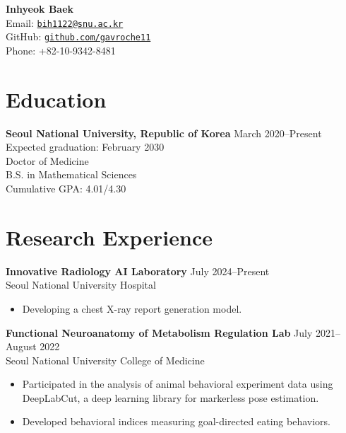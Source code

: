 \documentclass[11pt, a4paper]{article}
\begin{document}
\begin{center}
    \textbf{\Large Inhyeok Baek}\\
    \vspace{0.5mm}
    Email: \href{mailto:bih1122@snu.ac.kr}{\texttt{bih1122@snu.ac.kr}} \\
    GitHub: \href{https://github.com/gavroche11}{\texttt{github.com/gavroche11}} \\
    Phone: +82-10-9342-8481
\end{center}

\section*{Education}
\textbf{Seoul National University, Republic of Korea} \hfill March 2020--Present \\
\null\hfill {Expected graduation: February 2030}\smallskip \\
Doctor of Medicine\\
B.S. in Mathematical Sciences\\
Cumulative GPA: 4.01/4.30

\section*{Research Experience}
\textbf{Innovative Radiology AI Laboratory} \hfill July 2024--Present\\
Seoul National University Hospital \smallskip
\begin{itemize}[leftmargin=*, noitemsep, topsep=0pt, label=$\cdot$]
    \item Developing a chest X-ray report generation model.
\end{itemize}
\bigskip
\textbf{Functional Neuroanatomy of Metabolism Regulation Lab} \hfill July 2021--August 2022\\
Seoul National University College of Medicine \smallskip
\begin{itemize}[leftmargin=*, noitemsep, topsep=0pt, label=$\cdot$]
    \item \sloppy Participated in the analysis of animal behavioral experiment data using DeepLabCut, a deep learning library for markerless pose estimation.
    \item Developed behavioral indices measuring goal-directed eating behaviors.
\end{itemize}

\end{document}
